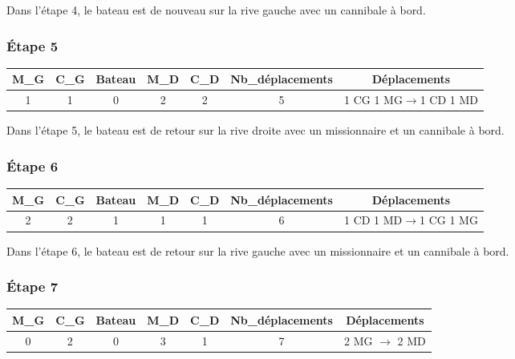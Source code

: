 \documentclass{article}
\begin{document}
\noindent Dans l'étape 4, le bateau est de nouveau sur la rive gauche avec un cannibale à bord.

\subsubsection{Étape 5}

\begin{center}
\begin{tabular}{|c|c|c|c|c|c|c|}
\hline
\textbf{M\_G} & \textbf{C\_G} & \textbf{Bateau} & \textbf{M\_D} & \textbf{C\_D} & \textbf{Nb\_déplacements} & \textbf{Déplacements} \\
\hline
1 & 1 & 0 & 2 & 2 & 5 &1 CG 1 MG$\rightarrow$1 CD 1 MD\\
\hline
\end{tabular}
\end{center}

\noindent Dans l'étape 5, le bateau est de retour sur la rive droite avec un missionnaire et un cannibale à bord.

\subsubsection{Étape 6}

\begin{center}
\begin{tabular}{|c|c|c|c|c|c|c|}
\hline
\textbf{M\_G} & \textbf{C\_G} & \textbf{Bateau} & \textbf{M\_D} & \textbf{C\_D} & \textbf{Nb\_déplacements} & \textbf{Déplacements} \\
\hline
2 & 2 & 1 & 1 & 1 & 6 & 1 CD 1 MD$\rightarrow$1 CG 1 MG\\
\hline
\end{tabular}
\end{center}

\noindent Dans l'étape 6, le bateau est de retour sur la rive gauche avec un missionnaire et un cannibale à bord.

\subsubsection{Étape 7}

\begin{center}
\begin{tabular}{|c|c|c|c|c|c|c|}
\hline
\textbf{M\_G} & \textbf{C\_G} & \textbf{Bateau} & \textbf{M\_D} & \textbf{C\_D} & \textbf{Nb\_déplacements} & \textbf{Déplacements} \\
\hline
0 & 2 & 0 & 3 & 1 & 7 & 2 MG $\rightarrow$ 2 MD \\
\hline
\end{tabular}
\end{center}
\end{document}

